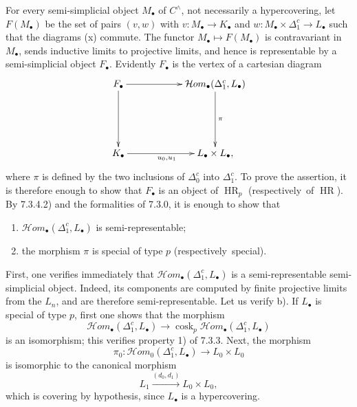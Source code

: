 \documentclass[11pt]{article}
\newcommand{\Hhom}{\mathcal{H}om}
\newcommand{\cosk}{\operatorname{cosk}}
\newcommand{\HR}{\operatorname{HR}}
\newcommand{\resp}{respectively}
\begin{document}
For every semi-simplicial object $M_\bullet$ of $C^{\wedge}$, not necessarily a hypercovering, let $F(M_\bullet)$ be the set of pairs $(v,w)$ with $v:M_\bullet\to K_\bullet$ and $w:M_\bullet\times\Delta_1^c\to L_\bullet$ such that the diagrams (x) commute. The functor $M_\bullet\mapsto F(M_\bullet)$ is contravariant in $M_\bullet$, sends inductive limits to projective limits, and hence is representable by a semi-simplicial object $F_\bullet$. Evidently $F_\bullet$ is the vertex of a cartesian diagram
\[
\xymatrix@=2cm{
F_\bullet\ar[r]\ar[d]&\Hhom_\bullet(\Delta_1^c,L_\bullet)\ar[d]^\pi\\
K_\bullet\ar[r]_{u_0,u_1}&L_\bullet\times L_\bullet,
}
\]
where $\pi$ is defined by the two inclusions of $\Delta_0^c$ into $\Delta_1^c$. To prove the assertion, it is therefore enough to show that $F_\bullet$ is an object of $\HR_p$ (\resp\ of $\HR$). By 7.3.4.2) and the formalities of 7.3.0, it is enough to show that
\begin{enumerate}[label=\alph*)]
\item $\Hhom_\bullet(\Delta_1^c,L_\bullet)$ is semi-representable;
\item the morphism $\pi$ is special of type $p$ (\resp\ special).
\end{enumerate}
First, one verifies immediately that $\Hhom_\bullet(\Delta_1^c,L_\bullet)$ is a semi-representable semi-simplicial object. Indeed, its components are computed by finite projective limits from the $L_n$, and are therefore semi-representable. Let us verify b). If $L_\bullet$ is special of type $p$, first one shows that the morphism
\[
        \Hhom_\bullet(\Delta_1^c,L_\bullet)\to\cosk_p\Hhom_\bullet(\Delta_1^c,L_\bullet)
\]
is an isomorphism; this verifies property 1) of 7.3.3. Next, the morphism
\[
        \pi_0:\Hhom_0(\Delta_1^c,L_\bullet)\to L_0\times L_0
\]
is isomorphic to the canonical morphism
\[
        L_1\xrightarrow{(d_0,d_1)}L_0\times L_0,
\]
which is covering by hypothesis, since $L_\bullet$ is a hypercovering.
\end{document}
